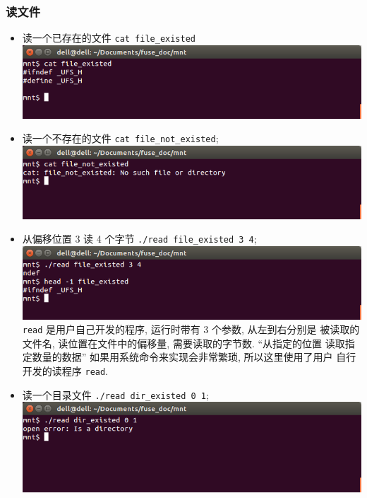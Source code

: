 \documentclass[nofonts, titlepage]{ctexart}
\begin{document}
\subsubsection{读文件}
\begin{itemize}
    \item 读一个已存在的文件 \texttt{cat file\_existed} \\
    \includegraphics[width=14cm]{./images/read_t0.png}
\item
  读一个不存在的文件 \texttt{cat file\_not\_existed};\\
  \includegraphics[width=14cm]{./images/./read_t1.png}
\item
  从偏移位置 3 读 4 个字节 \texttt{./read file\_existed 3 4};\\
  \includegraphics[width=14cm]{./images/./read_t2.png} \\
  \texttt{read} 是用户自己开发的程序, 运行时带有 3 个参数, 从左到右分别是
  被读取的文件名, 读位置在文件中的偏移量, 需要读取的字节数. ``从指定的位置
  读取指定数量的数据'' 如果用系统命令来实现会非常繁琐, 所以这里使用了用户
  自行开发的读程序 \texttt{read}.
\item
  读一个目录文件 \texttt{./read dir\_existed 0 1};\\
  \includegraphics[width=14cm]{./images/./read_t3.png}
\end{itemize}
\end{document}
